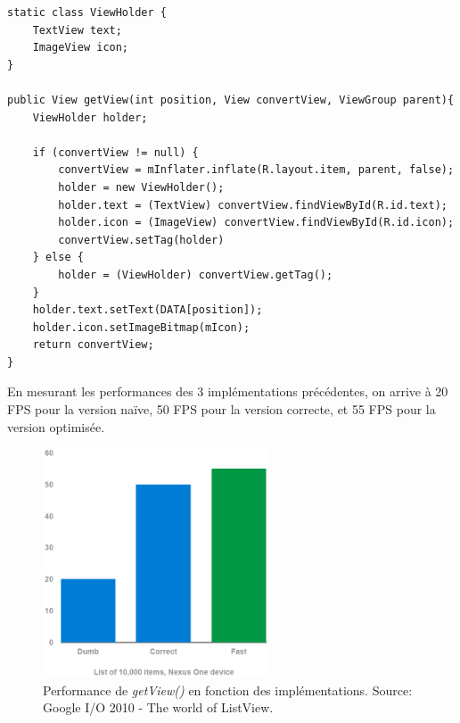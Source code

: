 \begin{adjustbox}{minipage=1.14\textwidth,margin=0pt \smallskipamount,center}
\begin{lstlisting}[style=Java, label=listview3, caption=Version optimisée]
static class ViewHolder {
	TextView text;
	ImageView icon;
}

public View getView(int position, View convertView, ViewGroup parent){ 
	ViewHolder holder;

	if (convertView != null) {
		convertView = mInflater.inflate(R.layout.item, parent, false);
		holder = new ViewHolder();
		holder.text = (TextView) convertView.findViewById(R.id.text);
		holder.icon = (ImageView) convertView.findViewById(R.id.icon);
		convertView.setTag(holder)
	} else {
		holder = (ViewHolder) convertView.getTag();
	}
	holder.text.setText(DATA[position]); 
	holder.icon.setImageBitmap(mIcon);
	return convertView; 
}
\end{lstlisting}
\end{adjustbox}

\newpage
En mesurant les performances des 3 implémentations précédentes, on arrive à 20 FPS pour la version naïve, 50 FPS pour la version correcte, et 55 FPS pour la version optimisée.\\

\begin{figure}[h]
  \center
  \includegraphics[width=0.6\textwidth]{resources/google_io_2010.png}
  \caption{Performance de \emph{getView()} en fonction des implémentations. Source: Google I/O 2010 - The world of ListView.}
  \label{fig:google_io_2010}
\end{figure}
